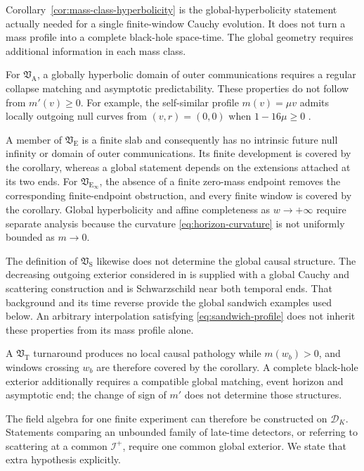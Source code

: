 \documentclass[11pt,a4paper]{article}
\theoremstyle{definition}
\theoremstyle{remark}
\newcommand{\D}{\mathcal D}
\newcommand{\scrI}{\mathscr I}
\begin{document}
	Corollary~\ref{cor:mass-class-hyperbolicity} is the global-hyperbolicity
	statement actually needed for a single finite-window Cauchy evolution.  It
	does not turn a mass profile into a complete black-hole space-time.  The
	global geometry requires additional information in each mass class.
	
	For $\mathfrak V_{\mathrm A}$, a globally hyperbolic domain of outer
	communications requires a regular collapse matching and asymptotic
	predictability.  These properties do not follow from $m'(v)\geq0$.  For
	example, the self-similar profile $m(v)=\mu v$ admits locally outgoing null
	curves from $(v,r)=(0,0)$ when $1-16\mu\geq0$
	\cite{DwivediJoshi1989}.
	
	A member of $\mathfrak V_{\mathrm E}$ is a finite slab and consequently has
	no intrinsic future null infinity or domain of outer communications.  Its
	finite development is covered by the corollary, whereas a global statement
	depends on the extensions attached at its two ends.  For
	$\mathfrak V_{\mathrm E_\infty}$, the absence of a finite zero-mass endpoint
	removes the corresponding finite-endpoint obstruction, and every finite
	window is covered by the corollary.  Global hyperbolicity and affine
	completeness as $w\to+\infty$ require separate analysis because the curvature
	\eqref{eq:horizon-curvature} is not uniformly bounded as $m\to0$.
	
	The definition of $\mathfrak V_{\mathrm S}$ likewise does not determine the
	global causal structure.  The decreasing outgoing exterior considered in
	\cite{Coudray2024} is supplied with a global Cauchy and scattering
	construction and is Schwarzschild near both temporal ends.  That background
	and its time reverse provide the global sandwich examples used below.  An
	arbitrary interpolation satisfying \eqref{eq:sandwich-profile} does not
	inherit these properties from its mass profile alone.
	
	A $\mathfrak V_{\mathrm T}$ turnaround produces no local causal pathology
	while $m(w_b)>0$, and windows crossing $w_b$ are therefore covered by the
	corollary.  A complete black-hole exterior additionally requires a compatible
	global matching, event horizon and asymptotic end; the change of sign of
	$m'$ does not determine those structures.
	
	The field algebra for one finite experiment can therefore be constructed on
	$\D_K$.  Statements comparing an unbounded family of late-time detectors,
	or referring to scattering at a common $\scrI^+$, require one common global
	exterior.  We state that extra hypothesis explicitly.
	
\end{document}
